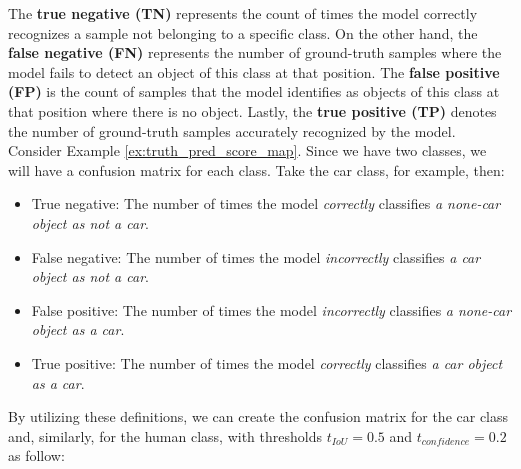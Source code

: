 The \textbf{true negative (TN)} represents the count of times the model correctly recognizes a sample not belonging to a specific class. On the other hand, the \textbf{false negative (FN)} represents the number of ground-truth samples where the model fails to detect an object of this class at that position. The \textbf{false positive (FP)} is the count of samples that the model identifies as objects of this class at that position where there is no object. Lastly, the \textbf{true positive (TP)} denotes the number of ground-truth samples accurately recognized by the model. Consider Example \ref{ex:truth_pred_score_map}. Since we have two classes, we will have a confusion matrix for each class. Take the car class, for example, then:
\begin{itemize}
    \item True negative: The number of times the model \emph{correctly} classifies \emph{a none-car object as not a car}.
    \item False negative: The number of times the model \emph{incorrectly} classifies \emph{a car object as not a car}.
    \item False positive: The number of times the model \emph{incorrectly} classifies \emph{a none-car object as a car}.
    \item True positive: The number of times the model \emph{correctly} classifies \emph{a car object as a car}.
\end{itemize}
By utilizing these definitions, we can create the confusion matrix for the car class and, similarly, for the human class, with thresholds $t_{IoU}=0.5$ and $t_{confidence}=0.2$ as follow:
